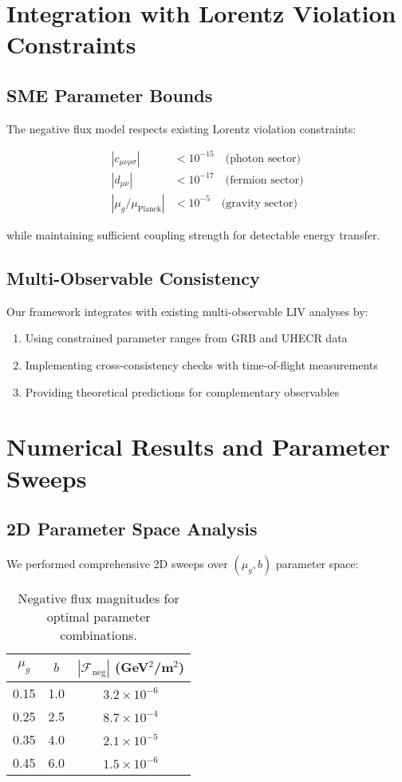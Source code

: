 \documentclass[12pt]{article}
\begin{document}
\section{Integration with Lorentz Violation Constraints}

\subsection{SME Parameter Bounds}

The negative flux model respects existing Lorentz violation constraints:

\begin{align}
|c_{\mu\nu\rho\sigma}| &< 10^{-15} \quad \text{(photon sector)} \\
|d_{\mu\nu}| &< 10^{-17} \quad \text{(fermion sector)} \\
|\mu_g/\mu_{\text{Planck}}| &< 10^{-5} \quad \text{(gravity sector)}
\end{align}

while maintaining sufficient coupling strength for detectable energy transfer.

\subsection{Multi-Observable Consistency}

Our framework integrates with existing multi-observable LIV analyses by:

\begin{enumerate}
\item Using constrained parameter ranges from GRB and UHECR data
\item Implementing cross-consistency checks with time-of-flight measurements
\item Providing theoretical predictions for complementary observables
\end{enumerate}

\section{Numerical Results and Parameter Sweeps}

\subsection{2D Parameter Space Analysis}

We performed comprehensive 2D sweeps over $(\mu_g, b)$ parameter space:

\begin{table}[h]
\centering
\begin{tabular}{ccc}
\toprule
$\mu_g$ & $b$ & $|\mathcal{F}_{\text{neg}}|$ (GeV$^2$/m$^2$) \\
\midrule
0.15 & 1.0 & $3.2 \times 10^{-6}$ \\
0.25 & 2.5 & $8.7 \times 10^{-4}$ \\
0.35 & 4.0 & $2.1 \times 10^{-5}$ \\
0.45 & 6.0 & $1.5 \times 10^{-6}$ \\
\bottomrule
\end{tabular}
\caption{Negative flux magnitudes for optimal parameter combinations.}
\end{table}
\end{document}
